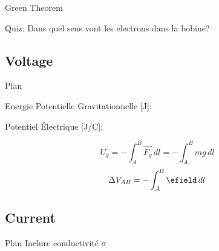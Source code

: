 \begin{frame}{Green Theorem}
    \begin{twocolumns}[0.5]
        \leftcol
        \rightcol
    \end{twocolumns}
    \vspace{-15pt}
    Quiz: Dans quel sens vont les electrons dans la bobine?
\end{frame}

\subsection[2min - Max]{Voltage}
\begin{frame}{Plan}
    \begin{twocolumns}[0.5]
        \leftcol
            \begin{center}
            Energie Potentielle Gravitationnelle [J]:
            \end{center}
        \rightcol
            \begin{center}
            Potentiel Électrique [J/C]:\\
            \end{center}
    \end{twocolumns}
    \begin{twocolumns}[0.5]
        \leftcol
            \begin{equation}
                U_{g} = -\int_{A}^{B}\vec{F_g} \,dl =  -\int_{A}^{B}mg\,dl
            \end{equation}
        \rightcol
            \begin{equation}
                \Delta V_{AB} = -\int_{A}^{B}\efield \,dl
            \end{equation}
    \end{twocolumns}
    \vspace{-24pt}
    \begin{twocolumns}[0.5]
        \leftcol
        \rightcol
    \end{twocolumns}
    \vfill
\end{frame}

\subsection[2min - Max]{Current}
\begin{frame}{Plan}
    Inclure conductivité $\sigma$ 
\end{frame}

